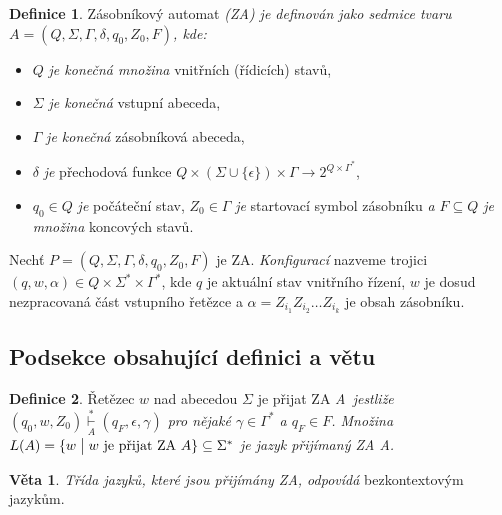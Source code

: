 \documentclass[a4paper,twocolumn,11pt]{article}[06-03-2022]
\theoremstyle{definition}
\newtheorem{theorem}{Definice}
\newtheorem{sentence}{Věta}
\begin{document}
\begin{theorem}\label{def1}
    Zásobníkový automat \emph{(ZA) je definován jako sedmice tvaru $A = (Q, \Sigma, \Gamma, \delta, q_0, Z_0, F)$, kde:} 
    \begin{itemize}
        \item $Q$ \emph{je konečná množina} vnitřních (řídicích) stavů,
        \item $\Sigma$ \emph{je konečná} vstupní abeceda,
        \item $\Gamma$ \emph{je konečná} zásobníková abeceda,
        \item $\delta$ \emph{je} přechodová funkce $Q \times (\Sigma \cup \{\epsilon\}) \times \Gamma \rightarrow 2^{Q \times \Gamma^\ast}$,
        \item $q_0 \in Q$ \emph{je} počáteční stav, $Z_0 \in \Gamma$ \emph{je} startovací symbol zásobníku \emph{a $F \subseteq Q$ je množina} koncových stavů.
    \end{itemize}
\end{theorem}
Nechť $P = (Q, \Sigma, \Gamma, \delta, q_0, Z_0, F)$ je ZA. \emph{Konfigurací} nazveme trojici $(q,w,\alpha) \in Q \times \Sigma^\ast \times \Gamma^\ast$, kde $q$ je aktuální stav vnitřního řízení, $w$ je dosud nezpracovaná část vstupního řetězce a $\alpha = Z_{i_1} Z_{i_2} \ldots Z_{i_k}$ je obsah zásobníku.

\subsection{Podsekce obsahující definici a větu}
\begin{theorem}\label{def2}
    Řetězec $w$ nad abecedou $\Sigma$ je přijat ZA \emph{A~jestliže $(q_0, w, Z_0) \overset{\ast}{\underset{A}{\vdash}} (q_F, \epsilon, \gamma)$ pro nějaké $\gamma \in \Gamma^\ast$ a $q_F \in F$.
    Množina $L(A) = \{w \bigm| w \textrm{ je přijat ZA } A \} \subseteq \Sigma^\ast$ je jazyk přijímaný ZA A.}
\end{theorem}
\begin{sentence}
    \emph{Třída jazyků, které jsou přijímány ZA, odpovídá} bezkontextovým jazykům.
\end{sentence}
\end{document}

